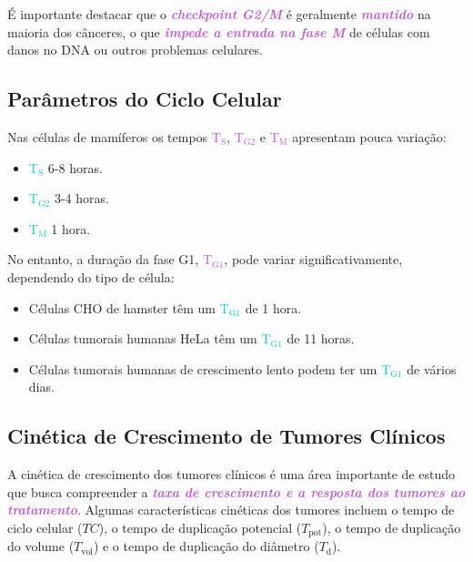\documentclass[11pt,a4paper]{article}
\begin{document}
	É importante destacar que o \textcolor{MediumOrchid}{\textbf{\textit{checkpoint G2/M}}} é geralmente \textcolor{MediumOrchid}{\textbf{\textit{mantido}}} na maioria dos cânceres, o que \textcolor{MediumOrchid}{\textbf{\textit{impede a entrada na fase M}}} de células com danos no DNA ou outros problemas celulares.

\subsection*{Parâmetros do Ciclo Celular}

	Nas células de mamíferos os tempos \textcolor{MediumOrchid}{\textbf{$\text{T}_\text{S}$}}, \textcolor{MediumOrchid}{\textbf{$\text{T}_\text{G2}$}} e \textcolor{MediumOrchid}{\textbf{$\text{T}_\text{M}$}} apresentam pouca variação:

	\begin{itemize}
		\item \textcolor{DarkTurquoise}{\textbf{$\text{T}_\text{S}$}} 6-8 horas.
		\item \textcolor{DarkTurquoise}{\textbf{$\text{T}_\text{G2}$}} 3-4 horas.
		\item \textcolor{DarkTurquoise}{\textbf{$\text{T}_\text{M}$}} 1 hora.
		\end{itemize}
		
		No entanto, a duração da fase G1, \textcolor{MediumOrchid}{\textbf{$\text{T}_\text{G1}$}},  pode variar significativamente, dependendo do tipo de célula:
		
		\begin{itemize}
		\item Células CHO de hamster têm um \textcolor{DarkTurquoise}{\textbf{$\text{T}_\text{G1}$}} de 1 hora.
		\item Células tumorais humanas HeLa têm um \textcolor{DarkTurquoise}{\textbf{$\text{T}_\text{G1}$}} de 11 horas.
		\item Células tumorais humanas de crescimento lento podem ter um \textcolor{DarkTurquoise}{\textbf{$\text{T}_\text{G1}$}} de vários dias.
	\end{itemize}

\subsection*{Cinética de Crescimento de Tumores Clínicos}

	A cinética de crescimento dos tumores clínicos é uma área importante de estudo que busca compreender a \textcolor{MediumOrchid}{\textbf{\textit{taxa de crescimento e a resposta dos tumores ao tratamento}}}. Algumas características cinéticas dos tumores incluem o tempo de ciclo celular ($TC$), o tempo de duplicação potencial ($T_{\text{pot}}$), o tempo de duplicação do volume ($T_{\text{vol}}$) e o tempo de duplicação do diâmetro ($T_{\text{d}}$).
\end{document}
